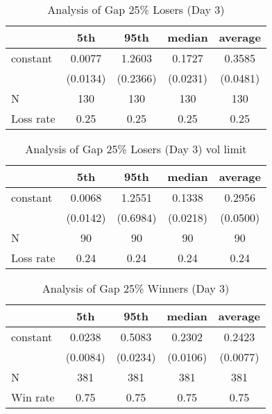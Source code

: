 \documentclass{article}
\begin{document}
\begin{table}
\caption{Analysis of Gap 25\% Losers (Day 3) }
\begin{center}
\begin{tabular}{lcccc}
\hline
          &   5th    &   95th   &  median  & average   \\
\midrule
\midrule
constant  & 0.0077   & 1.2603   & 0.1727   & 0.3585    \\
          & (0.0134) & (0.2366) & (0.0231) & (0.0481)  \\
N         & 130      & 130      & 130      & 130       \\
Loss rate & 0.25     & 0.25     & 0.25     & 0.25      \\
\hline
\end{tabular}
\end{center}
\end{table}

\begin{table}
\caption{Analysis of Gap 25\% Losers (Day 3) vol limit}
\begin{center}
\begin{tabular}{lcccc}
\hline
          &   5th    &   95th   &  median  & average   \\
\midrule
\midrule
constant  & 0.0068   & 1.2551   & 0.1338   & 0.2956    \\
          & (0.0142) & (0.6984) & (0.0218) & (0.0500)  \\
N         & 90       & 90       & 90       & 90        \\
Loss rate & 0.24     & 0.24     & 0.24     & 0.24      \\
\hline
\end{tabular}
\end{center}
\end{table}

\begin{table}
\caption{Analysis of Gap 25\% Winners (Day 3) }
\begin{center}
\begin{tabular}{lcccc}
\hline
         &   5th    &   95th   &  median  & average   \\
\midrule
\midrule
constant & 0.0238   & 0.5083   & 0.2302   & 0.2423    \\
         & (0.0084) & (0.0234) & (0.0106) & (0.0077)  \\
N        & 381      & 381      & 381      & 381       \\
Win rate & 0.75     & 0.75     & 0.75     & 0.75      \\
\hline
\end{tabular}
\end{center}
\end{table}
\end{document}
